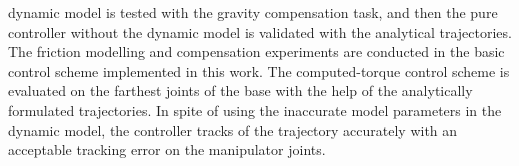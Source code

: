 dynamic model is tested with the gravity compensation task, and then the pure controller without the dynamic model is validated with the analytical trajectories. The friction modelling and compensation experiments are conducted in the basic control scheme implemented in this work. The computed-torque control scheme is evaluated on the farthest joints of the base with the help of the analytically formulated trajectories. In spite of using the inaccurate model parameters in the dynamic model, the controller tracks of the trajectory accurately with an acceptable tracking error on the manipulator joints.